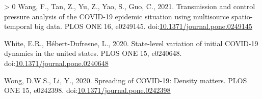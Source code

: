 \documentclass[]{elsarticle} %
\newlength{\cslhangindent}
\newenvironment{CSLReferences}[3] %
 {%
  \setlength{\parindent}{0pt}
  \ifodd #1 \everypar{\setlength{\hangindent}{\cslhangindent}}\ignorespaces\fi
  \ifnum #2 > 0
  \setlength{\parskip}{#2\baselineskip}
  \fi
 }%
 {}
\begin{document}
\begin{CSLReferences}{1}{0}
\leavevmode\hypertarget{ref-Wang2021transmission}{}%
Wang, F., Tan, Z., Yu, Z., Yao, S., Guo, C., 2021. Transmission and
control pressure analysis of the COVID-19 epidemic situation using
multisource spatio-temporal big data. PLOS ONE 16, e0249145.
doi:\href{https://doi.org/10.1371/journal.pone.0249145}{10.1371/journal.pone.0249145}

\leavevmode\hypertarget{ref-White2020state}{}%
White, E.R., Hébert-Dufresne, L., 2020. State-level variation of initial
COVID-19 dynamics in the united states. PLOS ONE 15, e0240648.
doi:\href{https://doi.org/10.1371/journal.pone.0240648}{10.1371/journal.pone.0240648}

\leavevmode\hypertarget{ref-Wong2020spreading}{}%
Wong, D.W.S., Li, Y., 2020. Spreading of COVID-19: Density matters. PLOS
ONE 15, e0242398.
doi:\href{https://doi.org/10.1371/journal.pone.0242398}{10.1371/journal.pone.0242398}

\end{CSLReferences}
\end{document}

